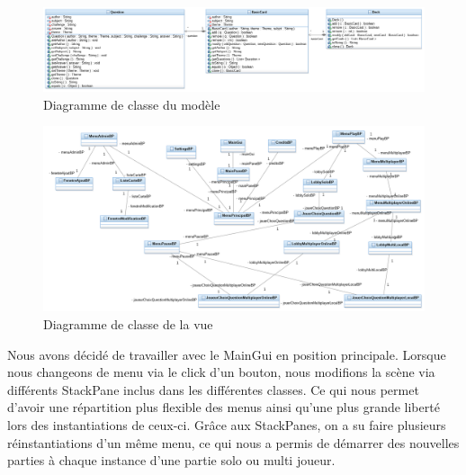 \begin{figure}[h]
	\centering
	\includegraphics[width=\textwidth]{ttmc_modele.png}
	\caption{Diagramme de classe du modèle}
	\label{fig:diag_modele}
\end{figure}

\begin{figure}[h]
	\centering
	\includegraphics[width=\textwidth]{ttmc_vue.png}
	\caption{Diagramme de classe de la vue}
	\label{fig:diag_vue}
\end{figure}

Nous avons décidé de travailler avec le MainGui en position principale.
Lorsque nous changeons de menu via le click d’un bouton, nous modifions la scène via différents StackPane inclus dans les différentes classes.
Ce qui nous permet d’avoir une répartition plus flexible des menus ainsi qu'une plus grande liberté lors des instantiations de ceux-ci.
Grâce aux StackPanes, on a su faire plusieurs réinstantiations d'un même menu, ce qui nous a permis de démarrer des nouvelles parties à chaque instance d'une partie solo ou multi joueur.
